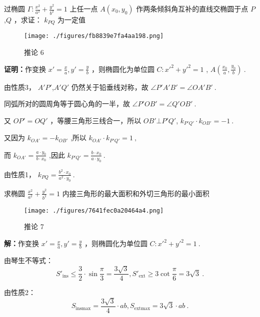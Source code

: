 \begin{corollary}{}
过椭圆 $\displaystyle{\Gamma:\frac{x^2}{a^2}+\frac{y^2}{b^2}=1}$ 上任一点 $\displaystyle{A(x_0,y_0)}$ 作两条倾斜角互补的直线交椭圆于点 $\displaystyle{P}$,$\displaystyle{Q}$ ，求证： $\displaystyle{k_{PQ}}$ 为一定值
\begin{figure}[ht]
\centering
\texttt{[image: ./figures/fb8839e7fa4aa198.png]}
\caption{推论 6} \label{fig_affine_5}
\end{figure}
\textbf{证明：}作变换 $\displaystyle{x'=\frac{x}{a},y'=\frac{y}{b}}$ ，则椭圆化为单位圆 $\displaystyle{C:x'^2+y'^2=1}$ , $\displaystyle{A\left(\frac{x_0}{a},\frac{y_0}{b}\right)}~.$ 

由性质3， $\displaystyle{A'P'}$,$\displaystyle{A'Q'}$ 仍然关于铅垂线对称，故 $\displaystyle{\angle P'A'B'=\angle OA'B'}~.$

同弧所对的圆周角等于圆心角的一半，故 $\displaystyle{\angle P'OB'=\angle Q'OB'}~.$

又 $\displaystyle{OP'=OQ'}$ ，等腰三角形三线合一，所以 $\displaystyle{OB'\bot P'Q' }$, $\displaystyle{k_{P'Q'}\cdot k_{OB'}=-1}~.$

又因为 $\displaystyle{k_{OA'}=-k_{OB'}}$ ,所以 $\displaystyle{k_{OA'}\cdot k_{P'Q'}=1~,}$

而 $\displaystyle{k_{OA'}=\frac{a\cdot y_0}{b\cdot x_0}}$ ,因此 $\displaystyle{k_{P'Q'}=\frac{b\cdot x_0}{a\cdot y_0}}~.$

由性质1， $\displaystyle{k_{PQ}=\frac{b^2\cdot x_0}{a^2 \cdot y_0}}~.$ 
\end{corollary}
\begin{corollary}{}
求椭圆 $\displaystyle{\frac{x^2}{a^2}+\frac{y^2}{b^2}=1}$ 内接三角形的最大面积和外切三角形的最小面积
\begin{figure}[ht]
\centering
\texttt{[image: ./figures/7641fec0a20464a4.png]}
\caption{推论 7} \label{fig_affine_6}
\end{figure}
\textbf{解：}作变换 $\displaystyle{x'=\frac{x}{a},y'=\frac{y}{b}}$ ，则椭圆化为单位圆 $\displaystyle{C:x'^2+y'^2=1}~.$

由琴生不等式：
$$S'_{\text{ins}}\leq \frac{3}{2}\cdot \sin\frac{\pi}{3}=\frac{3\sqrt{3}}{4}, S'_{\text{ext}}\geq 3\cot\frac{\pi}{6}=3\sqrt{3}~.$$ 


由性质2： 
$$S_{\text{ins}\max}=\frac{3\sqrt{3}}{4}\cdot ab, S_{\text{ext}\max}=3\sqrt{3}\cdot ab~.$$ 

\end{corollary}

